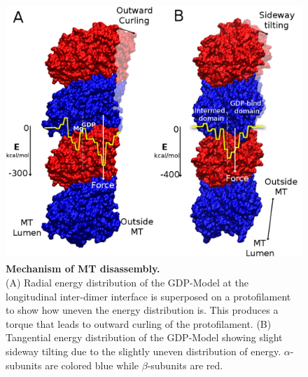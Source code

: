 \documentclass[11pt]{report}
\begin{document}
\begin{figure}[h]
  \centering
 \includegraphics[height=3.8in]{images/Fig7.pdf}
  \caption[Mechanism of MT disassembly]{{\bf Mechanism of MT disassembly.}\\
  (A) Radial energy distribution of the GDP-Model at the longitudinal inter-dimer interface is superposed on a protofilament to show how uneven the
  energy distribution is. This produces a torque that leads to outward curling of the protofilament.
  (B) Tangential energy distribution of the GDP-Model showing slight sideway tilting
  due to the slightly uneven distribution of energy.
 $\alpha$-subunits are colored
  blue while $\beta$-subunits are red.}
  \label{fig:Mech}
\end{figure}
\end{document}
